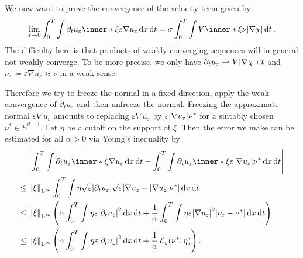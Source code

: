 We now want to prove the convergence of the velocity term given by
\begin{equation*}
	\lim_{ \varepsilon \to 0 }
		\int_{ 0 }^{ T }
			\int
				\partial_{ t } u_{ \varepsilon }
				\inner*{ \xi }{ \varepsilon \nabla u_{ \varepsilon } }
			\dd{ x }
		\dd{ t }
	=
	\sigma
	\int_{ 0 }^{ T }
		\int
			V \inner*{ \xi }{ \nu }
		\abs{ \nabla \chi }
	\dd{ t }.
\end{equation*}
The difficulty here is that products of weakly converging sequences will in general not weakly converge. To be more precise, we only have $ \partial_{ t } u_{ \varepsilon } \rightharpoonup V \abs{ \nabla \chi } \dd{ t } $ and $ \nu_{ \varepsilon } \coloneqq \varepsilon \nabla u_{ \varepsilon } \approx \nu $ in a weak sense. 

Therefore we try to freeze the normal in a fixed direction, apply the weak convergence of $ \partial_{ t } u_{ \varepsilon } $ and then unfreeze the normal. Freezing the approximate normal $ \varepsilon \nabla u_{ \varepsilon } $ amounts to replacing $ \varepsilon \nabla u_{ \varepsilon } $ by $ \varepsilon \abs{ \nabla u_{ \varepsilon } } \nu^{ \ast } $ for a suitably chosen $ \nu^{ \ast } \in \mathbb{ S }^{ d-1 } $. Let $ \eta $ be a cutoff on the support of $ \xi $. Then the error we make can be estimated for all $ \alpha > 0 $ via Young's inequality by
\begin{align*}
	&\abs{
		\int_{ 0 }^{ T }
			\int
				\partial_{ t } u_{ \varepsilon }
				\inner*{ \xi }{ \nabla u_{ \varepsilon } }
			\dd{ x }
		\dd{ t }
		-
		\int_{ 0 }^{ T }
			\int
				\partial_{ t } u_{ \varepsilon }
				\inner*{ \xi }{ \varepsilon \abs{ \nabla u_{ \varepsilon } } \nu^{ \ast } }
			\dd{ x }
		\dd{ t }
	}
	\\
	\leq {} &
	\norm{ \xi }_{ \lp^{ \infty } }
	\int_{ 0 }^{ T }
		\int
			\eta
			\sqrt{ \varepsilon }
			\abs{ \partial_{  t } u_{ \varepsilon } }
			\sqrt{  \varepsilon } 
			\abs{
				\nabla u_{ \varepsilon }
				-
				\abs{ \nabla u_{ \varepsilon } }
				\nu^{ \ast }
			}
		\dd{ x } 
	\dd{ t }
	\\
	\leq {} &
	\norm{ \xi }_{ \lp^{ \infty } }
	\left(
		\alpha 
		\int_{ 0 }^{ T }
			\int
				\eta
				\varepsilon \abs{ \partial_{ t } u_{ \varepsilon } }^{ 2 }
			\dd{ x }
		\dd{ t }
		+
		\frac{ 1 }{ \alpha }
		\int_{ 0 }^{ T }
			\int
				\eta
				\varepsilon
				\abs{ \nabla u_{ \varepsilon } }^{ 2 }
				\abs{
					\nu_{ \varepsilon } - \nu^{ \ast } 
				} 
			\dd{ x }
		\dd{ t }
	\right)
	\\
	\leq{}
	&
	\norm{ \xi }_{ \lp^{ \infty } }
	\left( 
		\alpha 	
		\int_{ 0 }^{ T }
			\int
				\eta
				\varepsilon \abs{ \partial_{ t } u_{ \varepsilon } }^{ 2 }
			\dd{ x }
		\dd{ t }
		+ 
		\frac{ 1 }{ \alpha }
		\tilt_excess_{ \varepsilon } ( \nu^{ \ast } ; \eta ) 
	\right).
\end{align*}
